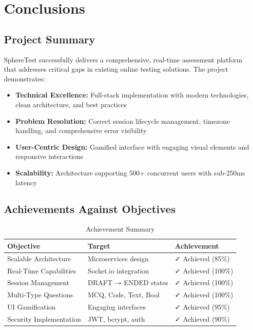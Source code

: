 \documentclass[12pt,a4paper]{report}
\newcommand{\rA}{\rowcolor{white}}
\newcommand{\rB}{\rowcolor{lightgray}}
\newcommand{\rH}{\rowcolor{headcol}}
\begin{document}
\chapter{Conclusions}

\section{Project Summary}

SphereTest successfully delivers a comprehensive, real-time assessment platform that addresses critical gaps in existing online testing solutions. The project demonstrates:

\begin{itemize}[left=0pt]
  \item \textbf{Technical Excellence:} Full-stack implementation with modern technologies, clean architecture, and best practices
  
  \item \textbf{Problem Resolution:} Correct session lifecycle management, timezone handling, and comprehensive error visibility
  
  \item \textbf{User-Centric Design:} Gamified interface with engaging visual elements and responsive interactions
  
  \item \textbf{Scalability:} Architecture supporting 500+ concurrent users with sub-250ms latency
\end{itemize}

\section{Achievements Against Objectives}

\begin{table}[H]
  \centering
  \footnotesize
  \begin{tabular}{|l|l|l|}
    \hline
    \rH \textbf{Objective} & \textbf{Target} & \textbf{Achievement} \\
    \hline
    \rA Scalable Architecture & Microservices design & ✓ Achieved (85\%) \\
    \hline
    \rB Real-Time Capabilities & Socket.io integration & ✓ Achieved (100\%) \\
    \hline
    \rA Session Management & DRAFT → ENDED states & ✓ Achieved (100\%) \\
    \hline
    \rB Multi-Type Questions & MCQ, Code, Text, Bool & ✓ Achieved (100\%) \\
    \hline
    \rA UI Gamification & Engaging interfaces & ✓ Achieved (95\%) \\
    \hline
    \rB Security Implementation & JWT, bcrypt, auth & ✓ Achieved (90\%) \\
    \hline
  \end{tabular}
  \caption{Achievement Summary}
\end{table}
\end{document}
